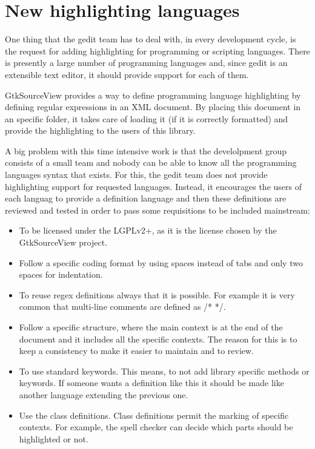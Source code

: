 
\chapter{New highlighting languages}

One thing that the gedit team has to deal with, in every development cycle, is the request for adding highlighting for programming or scripting languages.  There is presently a large number of programming languages and, since gedit is an extensible text editor, it should provide support for each of them.

GtkSourceView provides a way to define programming language highlighting by defining regular expressions in an XML document. By placing this document in an specific folder, it takes care of loading it (if it is correctly formatted) and provide the highlighting to the users of this library.

A big problem with this time intensive work is that the develolpment group consists of a small team and nobody can be able to know 
all the programming languages syntax that exists. For this, the gedit team does not provide highlighting support for 
requested languages. Instead, it encourages the users of each languag to provide a definition language and then these definitions 
are reviewed and tested in order to pass some requisitions to be included mainstream:
\begin{itemize}
  \item To be licensed under the LGPLv2+, as it is the license chosen by the GtkSourceView project.
  \item Follow a specific coding format by using spaces instead of tabs and only two spaces for indentation.
  \item To reuse regex definitions always that it is possible. For example it is very common that multi-line comments are defined as /* */.
  \item Follow a specific structure, where the main context is at the end of the document and it includes all the specific contexts. The reason for this is to keep a consistency to make it easier to maintain and to review.
  \item To use standard keywords. This means, to not add library specific methods or keywords. If someone wants a definition like this it should be made like another language extending the previous one.
  \item Use the class definitions. Class definitions permit the marking of specific contexts. For example,  the spell checker can decide which parts should be highlighted or not.
\end{itemize}

